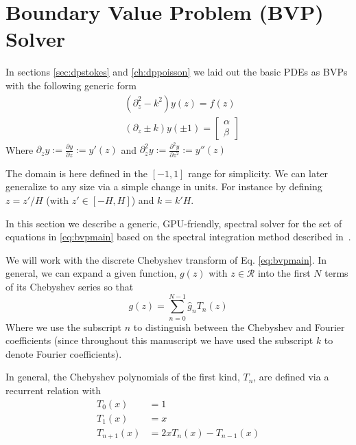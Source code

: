 \documentclass[twoside,openright,titlepage,numbers=noenddot,%
headinclude,footinclude,cleardoublepage=empty,abstract=on,
BCOR=5mm,fontsize=11pt, dvipsnames, paper=b5
]{scrreprt}
\newcommand{\gpu}{\gls{GPU}\xspace}
\newcommand{\fou}[1]{\widehat{#1}}
\begin{document}
\chapter{Boundary Value Problem (BVP) Solver} \label{sec:bvp}
In sections \ref{sec:dpstokes} and \ref{ch:dppoisson} we laid out the basic \glspl{PDE} as \glspl{BVP} with the following generic form
\begin{equation}
  \label{eq:bvpmain}
  \begin{aligned}
    &(\partial^2_{z}-k^2)y(z)=f(z)\\
    &(\partial_{z}\pm k)y(\pm 1)=
    \begin{bmatrix}
      \alpha\\
      \beta
    \end{bmatrix}
\end{aligned}
\end{equation}
Where $\partial_z y:= \frac{\partial y}{\partial z} := y'(z)$ and $\partial^2_{z} y:= \frac{\partial^2 y}{\partial z^2} := y''(z)$

The domain is here defined in the $[-1, 1]$ range for simplicity. We can later generalize to any size via a simple change in units. For instance by defining $z = z'/H$ (with $z'\in [-H, H]$) and $k = k'H$.

In this section we describe a generic, \gpu-friendly, spectral solver for the set of equations in \eqref{eq:bvpmain} based on the spectral integration method described in~\cite{Greengard1991}.

We will work with the discrete Chebyshev transform of Eq. \eqref{eq:bvpmain}. In general, we can expand a given function, $g(z)$ with $z\in \mathcal{R}$ into the first $N$ terms of its Chebyshev series so that
\begin{equation}
\label{eq:bvpchebexp}
g(z) = \sum_{n=0}^{N-1} \fou{g}_n T_n(z)
\end{equation}
Where we use the subscript $n$ to distinguish between the Chebyshev and Fourier coefficients (since throughout this manuscript we have used the subscript $k$ to denote Fourier coefficients).

In general, the Chebyshev polynomials of the first kind, $T_n$, are defined via a recurrent relation with
\begin{equation}
  \label{eq:bvpchebpoly}
  \begin{aligned}
    T_0(x) &= 1\\
    T_1(x) &= x\\
    T_{n+1}(x) &= 2xT_n(x) - T_{n-1}(x)
  \end{aligned}
\end{equation}
\end{document}
